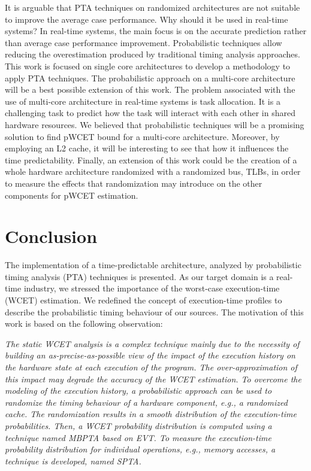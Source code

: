     
It is arguable that PTA techniques on randomized architectures are not suitable to improve the average case performance. Why should it be used in real-time systems? In real-time systems, the main focus is on the accurate prediction rather than average case performance improvement. Probabilistic techniques allow reducing the overestimation produced by traditional timing analysis approaches. This work is focused on single core architectures to develop a methodology to apply PTA techniques. The probabilistic approach on a multi-core architecture will be a best possible extension of this work. The problem associated with the use of multi-core architecture in real-time systems is task allocation. It is a challenging task to predict how the task will interact with each other in shared hardware resources. We believed that probabilistic techniques will be a promising solution to find pWCET bound for a multi-core architecture. Moreover, by employing an L2 cache, it will be interesting to see that how it influences the time predictability. Finally, an extension of this work could be the creation of a whole hardware architecture randomized with a randomized bus, TLBs, in order to measure the effects that randomization may introduce on the other components for pWCET estimation. 


\section{Conclusion}

The implementation of a time-predictable architecture, analyzed by probabilistic timing analysis (PTA) techniques is presented. As our target domain is a real-time industry, we stressed the importance of the worst-case execution-time (WCET) estimation. We redefined the concept of execution-time profiles to describe the probabilistic timing behaviour of our sources. The motivation of this work is based on the following observation: 

\textit{The static WCET analysis is a complex technique mainly due to the necessity of building an as-precise-as-possible view of the impact of the execution history on the hardware state at each execution of the program. The over-approximation of this impact may degrade the accuracy of the WCET estimation. To overcome the modeling of the execution history, a probabilistic approach can be used to randomize the timing behaviour of a hardware component, e.g., a randomized cache. The randomization results in a smooth distribution of the execution-time probabilities. Then, a WCET probability distribution is computed  using a technique named MBPTA based on EVT. To measure the execution-time probability distribution for individual operations, e.g., memory accesses, a technique is developed, named SPTA.} 

